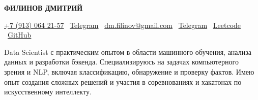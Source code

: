 
\begin{center}
  {\huge\rmfamily\bfseries ФИЛИНОВ ДМИТРИЙ}
\end{center}
\begin{center}
\href{tel:+79130642157}{+7 (913) 064 21-57} \textbar\ 
\href{https://t.me/d1ffic00lt}{Telegram} \textbar\ 
\href{mailto:dm.filinov@gmail.com}{dm.filinov@gmail.com} \textbar\
  \href{https://t.me/D1ffic00lt}{Telegram} \textbar\ 
  \href{https://leetcode.com/u/D1ffic00lt/}{Leetcode} \textbar\ 
  \href{https://github.com/D1ffic00lt}{GitHub}
\end{center}
Data Scientist с практическим опытом в области машинного обучения, анализа данных и разработки бэкенда. Специализируюсь на задачах компьютерного зрения и NLP, включая классификацию, обнаружение и проверку фактов. Имею опыт создания сложных решений и участия в соревнованиях и хакатонах по искусственному интеллекту.